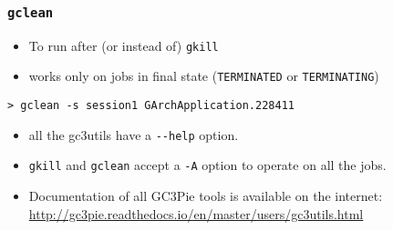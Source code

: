 \documentclass[english,serif,mathserif,xcolor=pdftex,dvipsnames,table]{beamer}
\begin{document}
\begin{frame}[fragile]
  \frametitle{\texttt{gclean}}
  \begin{itemize}
  \item To run after (or instead of) \lstinline|gkill|
  \item works only on jobs in final state (\lstinline|TERMINATED| or
    \lstinline|TERMINATING|)
  \end{itemize}

\begin{lstlisting}[basicstyle=\tt\scriptsize]
> gclean -s session1 GArchApplication.228411
\end{lstlisting}
\end{frame}

\begin{frame}[fragile]
  \begin{itemize}
  \item all the gc3utils have a \lstinline|--help| option.
  \item \lstinline|gkill| and \lstinline|gclean| accept a \lstinline|-A| option to operate on all the jobs.
  \item Documentation of all GC3Pie tools is available on the internet:
    \url{http://gc3pie.readthedocs.io/en/master/users/gc3utils.html}
  \end{itemize}
\end{frame}
\end{document}
